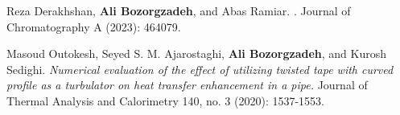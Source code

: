 
\begin{scholarship}

  {
    Reza Derakhshan, \textbf{Ali Bozorgzadeh}, and Abas Ramiar.
    .
    Journal of Chromatography A (2023): 464079.
  }

  {
    Masoud Outokesh, Seyed S. M. Ajarostaghi, \textbf{Ali Bozorgzadeh}, and Kurosh Sedighi.
     {\itshape Numerical evaluation of the effect of utilizing twisted tape with curved profile as a turbulator on heat transfer enhancement in a pipe.}
    Journal of Thermal Analysis and Calorimetry 140, no. 3 (2020): 1537-1553.
  }
\end{scholarship}
